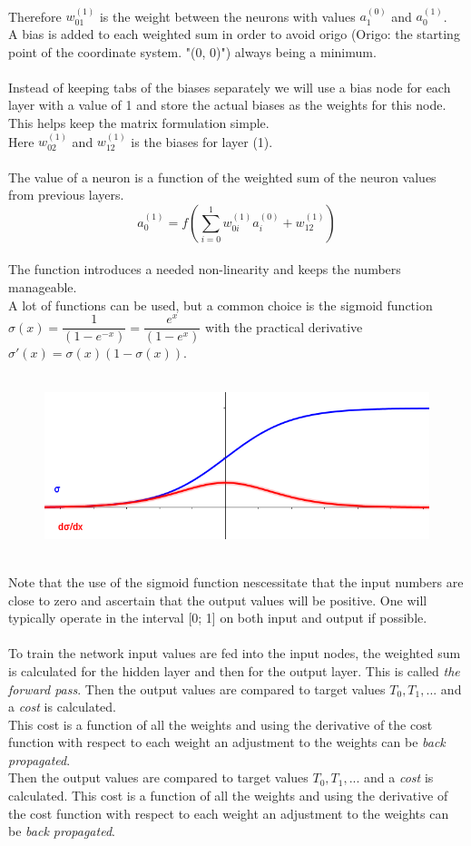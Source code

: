 \documentclass{article}
\begin{document}
\\
Therefore $w_{01}^{(1)}$ is the weight between the neurons with values $a_1^{(0)}$ and $a_0^{(1)}$.
\\
A bias is added to each weighted sum in order to avoid origo (Origo: the starting point of the coordinate system. "(0, 0)") always being a minimum.
\\
\\
Instead of keeping tabs of the biases separately we will use a bias node for each layer with a value of 1 and store the actual biases as the weights for this node. This helps keep the matrix formulation simple.
\\
Here $w_{02}^{(1)}$ and $w_{12}^{(1)}$ is the biases for layer (1).
\\
\\ 
The value of a neuron is a function of the weighted sum of the neuron values from previous layers. $$a_0^{(1)} = f(\sum_{i=0}^{1}{w_{0i}^{(1)}a_i^{(0)}}+w_{12}^{(1)})$$
\\
The function introduces a needed non-linearity and keeps the numbers manageable.
\\
A lot of functions can be used, but a common choice is the sigmoid function $\sigma(x) = \dfrac{1}{(1-e^{-x})} = \dfrac{e^{x}}{(1-e^{x})}$ with the practical derivative $\sigma'(x) = \sigma(x)(1 - \sigma(x)) $.
\\
\\
\begin{figure}[h]
\includegraphics[scale=.5]{sigmoid}
\centering
\end{figure}
\\
Note that the use of the sigmoid function nescessitate that the input numbers are close to zero and ascertain that the output values will be positive. One will typically operate in the interval [0; 1] on both input and output if possible.
\\
\\
To train the network input values are fed into the input nodes, the weighted sum is calculated for the hidden layer and then for the output layer. This is called \textit{the forward pass}. Then the output values are compared to target values $T_0, T_1, ...$ and a \textit{cost} is calculated.
\\
This cost is a function of all the weights and using the derivative of the cost function with respect to each weight an adjustment to the weights can be \textit{back propagated}.
\\
Then the output values are compared to target values $T_0, T_1, ...$ and a \textit{cost} is calculated. This cost is a function of all the weights and using the derivative of the cost function with respect to each weight an adjustment to the weights can be \textit{back propagated}.
\\
\end{document}
